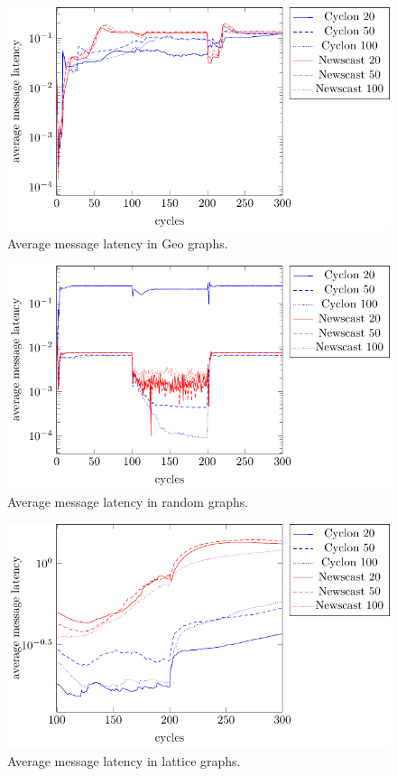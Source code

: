 \documentclass[a4paper]{ifacconf}
\begin{document}
\begin{figure}[p]
    \centering
    \includegraphics[width=.9\linewidth]{"figures/average_message_latency/average message latency geo"}
    \caption{Average message latency in Geo graphs.}
    \label{fig:average-message-latency-geo}
\end{figure}
\begin{figure}[p]
    \centering
    \includegraphics[width=.9\linewidth]{"figures/average_message_latency/average message latency random"}
    \caption{Average message latency in random graphs.}
    \label{fig:average-message-latency-random}
\end{figure}
\begin{figure}[p]
    \centering
    \includegraphics[width=.9\linewidth]{"figures/average_message_latency/average message latency lattice"}
    \caption{Average message latency in lattice graphs.}
    \label{fig:average-message-latency-lattice}
\end{figure}
\end{document}
